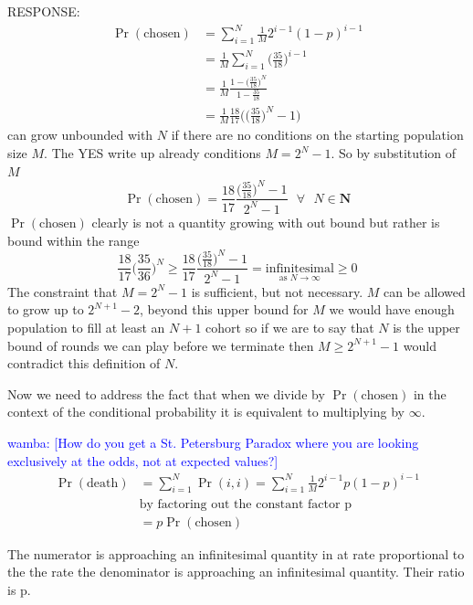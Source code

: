 \documentclass[article,twocolumn]{memoir}
\newcommand{\wamba} [1]{\ifnum\Chatty=1 \textcolor{blue}{wamba:  [#1]} \fi}
\begin{document}
\begin{itemize}
   {\color{violet}
        RESPONSE:
        \begin{align*}
            \Pr(\text{chosen}) &= \sum_{i=1}^{N} \tfrac{1}{M} 2^{i-1}(1-p)^{i-1}\\
            &= \frac{1}{M} \sum_{i=1}^{N} \bigg(\frac{35}{18}\bigg)^{i-1}\\
            &= \frac{1}{M} \frac{1-\bigg(\frac{35}{18}\bigg)^{N}}{1-\frac{35}{18}}\\
            &= \frac{1}{M} \frac{18}{17}\bigg(\big(\frac{35}{18}\big)^N-1\bigg)
        \end{align*}
        can grow unbounded with $N$ if there are no conditions on the starting population size $M$.  The YES write up already conditions $M = 2^N-1$.  So by substitution of $M$
        $$\Pr(\text{chosen})= \frac{18}{17}\frac{\big(\frac{35}{18}\big)^N-1}{2^N-1} \text{  }\forall\text{  }N \in \mathbf{N}$$
        $\Pr(\text{chosen})$ clearly is not a quantity growing with out bound but rather is bound within the range 
        $$\frac{18}{17}\bigg(\frac{35}{36}\bigg)^N\geq \frac{18}{17}\frac{\big(\frac{35}{18}\big)^N-1}{2^N-1}  = \underset{\text{as }N\to\infty }{\text{infinitesimal}} \geq 0$$
        The constraint that $M = 2^N-1$ is sufficient, but not necessary. $M$ can be allowed to grow up to $2^{N+1}-2$, beyond this upper bound for $M$ we would have enough population to fill at least an $N+1$ cohort so if we are to say that $N$ is the upper bound of rounds we can play before we terminate then $M\geq 2^{N+1}-1$ would contradict this definition of $N$.

        Now we need to address the fact that when we divide by $\Pr(\text{chosen})$ in the context of the conditional probability it is equivalent to multiplying by $\infty$.

        \wamba{How do you get a St. Petersburg Paradox where you are looking exclusively at the odds, not at expected values?}
        \begin{align*}
            \Pr(\text{death})& = \sum_{i=1}^{N} \Pr(i,i)= \sum_{i=1}^{N} \tfrac{1}{M} 2^{i-1}p(1-p)^{i-1}\\
            & \text{by factoring out the constant factor p} \\
            & = p\Pr(\text{chosen})
        \end{align*}

        The numerator is approaching an infinitesimal quantity in at rate proportional to the the rate the denominator is approaching an infinitesimal quantity.  Their ratio is p.
    }
    

\end{itemize}
\end{document}
